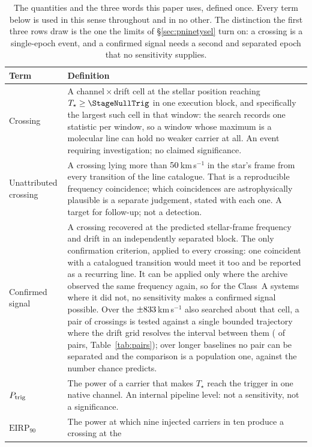 \begin{table}
\centering
\caption{The quantities and the three words this paper uses, defined once.
Every term below is used in this sense throughout and in no other. The
distinction the first three rows draw is the one the limits of
\S\ref{sec:pninetysel} turn on: a crossing is a single-epoch event, and a
confirmed signal needs a second and separated epoch that no sensitivity
supplies.}
\label{tab:quantities}
\small
\begin{tabular}{@{}p{}p{}@{}}
\hline
Term & Definition \\
\hline
Crossing &
A channel\,$\times$\,drift cell at the stellar position reaching
$T_\star\geq\StageNullTrig$ in one execution block, and specifically the
largest such cell in that window: the search records one statistic per window,
so a window whose maximum is a molecular line can hold no weaker carrier at
all. An event requiring investigation; no claimed significance. \\
Unattributed crossing &
A crossing lying more than $50$\,km\,s$^{-1}$ in the star's frame
from every transition of the line catalogue. That is a reproducible frequency
coincidence; which coincidences are astrophysically plausible is a separate
judgement, stated with each one. A target for follow-up; not a detection. \\
Confirmed signal &
A crossing recovered at the predicted stellar-frame frequency and drift in an
independently separated block. The only confirmation criterion, applied to
every crossing: one coincident with a catalogued transition would meet it too
and be reported as a recurring line. It can be applied only where the archive
observed the same frequency again, so for the \ScSysNoConf{} Class~A systems
where it did not, no sensitivity makes a confirmed signal possible. Over the
$\pm833$\,km\,s$^{-1}$ also searched about that cell, a pair of
crossings is tested against a single bounded trajectory where the drift grid
resolves the interval between them (\TjNPower{} of \TjNPair{} pairs,
Table~\ref{tab:pairs}); over longer baselines no pair can be separated and
the comparison is a population one, against the number chance predicts. \\
$P_{\rm trig}$ &
The power of a carrier that makes $T_\star$ reach the trigger in one native
channel. An internal pipeline level: not a sensitivity, not a
significance. \\
$\mathrm{EIRP}_{90}$ &
The power at which nine injected carriers in ten produce a crossing at the

\end{tabular}
\end{table}
